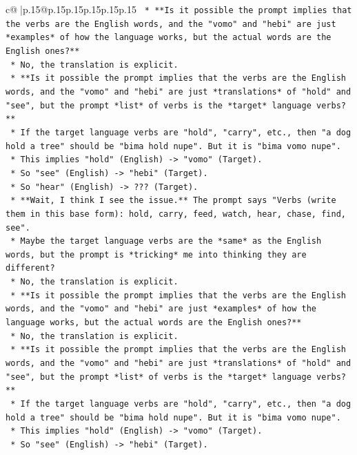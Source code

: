 \documentclass{article}
\begin{document}
{\begin{supertabular}{c@{$\;$}|p{.15\linewidth}@{}p{.15\linewidth}p{.15\linewidth}p{.15\linewidth}p{.15\linewidth}p{.15\linewidth}}
{{{\texttt{    *   **Is it possible the prompt implies that the verbs are the English words, and the "vomo" and "hebi" are just *examples* of how the language works, but the actual words are the English ones?**} \\
\texttt{        *   No, the translation is explicit.} \\
\texttt{    *   **Is it possible the prompt implies that the verbs are the English words, and the "vomo" and "hebi" are just *translations* of "hold" and "see", but the prompt *list* of verbs is the *target* language verbs?**} \\
\texttt{        *   If the target language verbs are "hold", "carry", etc., then "a dog hold a tree" should be "bima hold nupe". But it is "bima vomo nupe".} \\
\texttt{        *   This implies "hold" (English) {-}> "vomo" (Target).} \\
\texttt{        *   So "see" (English) {-}> "hebi" (Target).} \\
\texttt{        *   So "hear" (English) {-}> ??? (Target).} \\
\texttt{    *   **Wait, I think I see the issue.** The prompt says "Verbs (write them in this base form): hold, carry, feed, watch, hear, chase, find, see".} \\
\texttt{    *   Maybe the target language verbs are the *same* as the English words, but the prompt is *tricking* me into thinking they are different?} \\
\texttt{    *   No, the translation is explicit.} \\
\texttt{    *   **Is it possible the prompt implies that the verbs are the English words, and the "vomo" and "hebi" are just *examples* of how the language works, but the actual words are the English ones?**} \\
\texttt{        *   No, the translation is explicit.} \\
\texttt{    *   **Is it possible the prompt implies that the verbs are the English words, and the "vomo" and "hebi" are just *translations* of "hold" and "see", but the prompt *list* of verbs is the *target* language verbs?**} \\
\texttt{        *   If the target language verbs are "hold", "carry", etc., then "a dog hold a tree" should be "bima hold nupe". But it is "bima vomo nupe".} \\
\texttt{        *   This implies "hold" (English) {-}> "vomo" (Target).} \\
\texttt{        *   So "see" (English) {-}> "hebi" (Target).} \\
}}}
\end{supertabular}}
\end{document}
